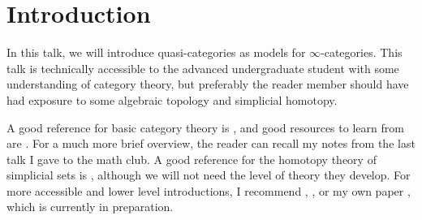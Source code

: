\section{Introduction}

In this talk, we will introduce quasi-categories as models for $\infty $-categories. This talk is technically accessible to the advanced undergraduate student with some understanding of category theory, but preferably the reader member should have had exposure to some algebraic topology and simplicial homotopy.

A good reference for basic category theory is \cite{ml}, and good resources to learn from are \cite{context,lein}. For a much more brief overview, the reader can recall my notes \cite{notes} from the last talk I gave to the math club. A good reference for the homotopy theory of simplicial sets is \cite{gj}, although we will not need the level of theory they develop. For more accessible and lower level introductions, I recommend \cite{riehlssets}, \cite{fried}, or my own paper \cite{ssets}, which is currently in preparation. 
